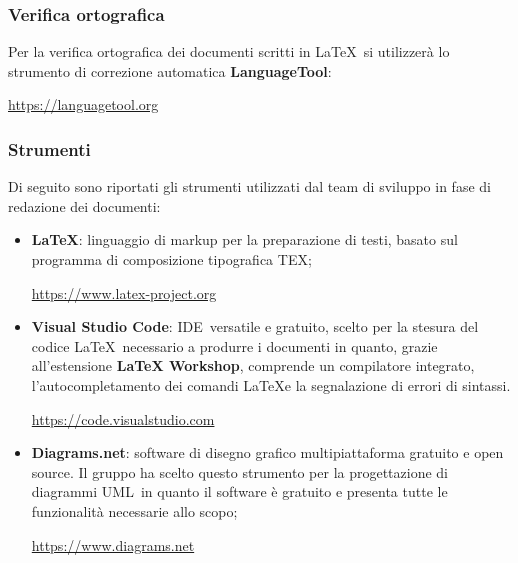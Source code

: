 \subsubsection{Verifica ortografica} \label{verifica_ortografica}
Per la verifica ortografica dei documenti scritti in \LaTeX\ si utilizzerà lo strumento di correzione automatica \textbf{LanguageTool}:
    \begin{center}\url{https://languagetool.org}\end{center}

\subsubsection{Strumenti}
Di seguito sono riportati gli strumenti utilizzati dal team di sviluppo in fase di redazione dei documenti:
\begin{itemize}
    \item \textbf{\LaTeX}: linguaggio di markup per la preparazione di testi, basato sul programma di composizione tipografica TEX;
         \begin{center}\url{https://www.latex-project.org}\end{center}
    \item \textbf{Visual Studio Code}: IDE\glo\ versatile e gratuito, scelto per la stesura del codice \LaTeX\ necessario a produrre i documenti in quanto, grazie all'estensione \textbf{LaTeX Workshop}, comprende un compilatore integrato, l'autocompletamento dei comandi \LaTeX e la segnalazione di errori di sintassi.
        \begin{center}\url{https://code.visualstudio.com}\end{center}
    \item \textbf{Diagrams.net}: software di disegno grafico multipiattaforma gratuito e open source. Il gruppo ha scelto questo strumento per la progettazione di diagrammi UML\glo\ in quanto il software è gratuito e presenta tutte le funzionalità necessarie allo scopo;
        \begin{center}\url{https://www.diagrams.net}\end{center}
\end{itemize}

